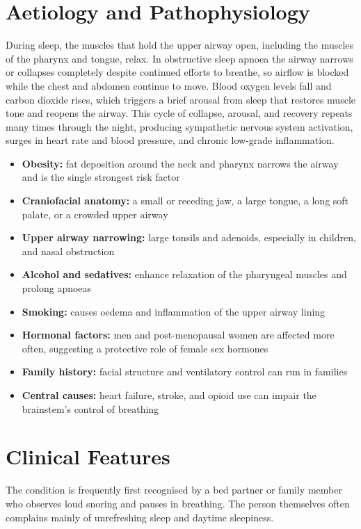 \section*{Aetiology and Pathophysiology}
During sleep, the muscles that hold the upper airway open, including the muscles of the pharynx and tongue, relax. In obstructive sleep apnoea the airway narrows or collapses completely despite continued efforts to breathe, so airflow is blocked while the chest and abdomen continue to move. Blood oxygen levels fall and carbon dioxide rises, which triggers a brief arousal from sleep that restores muscle tone and reopens the airway. This cycle of collapse, arousal, and recovery repeats many times through the night, producing sympathetic nervous system activation, surges in heart rate and blood pressure, and chronic low-grade inflammation.

\begin{itemize}
    \item \textbf{Obesity:} fat deposition around the neck and pharynx narrows the airway and is the single strongest risk factor
    \item \textbf{Craniofacial anatomy:} a small or receding jaw, a large tongue, a long soft palate, or a crowded upper airway
    \item \textbf{Upper airway narrowing:} large tonsils and adenoids, especially in children, and nasal obstruction
    \item \textbf{Alcohol and sedatives:} enhance relaxation of the pharyngeal muscles and prolong apnoeas
    \item \textbf{Smoking:} causes oedema and inflammation of the upper airway lining
    \item \textbf{Hormonal factors:} men and post-menopausal women are affected more often, suggesting a protective role of female sex hormones
    \item \textbf{Family history:} facial structure and ventilatory control can run in families
    \item \textbf{Central causes:} heart failure, stroke, and opioid use can impair the brainstem's control of breathing
\end{itemize}

\section*{Clinical Features}
The condition is frequently first recognised by a bed partner or family member who observes loud snoring and pauses in breathing. The person themselves often complains mainly of unrefreshing sleep and daytime sleepiness.


